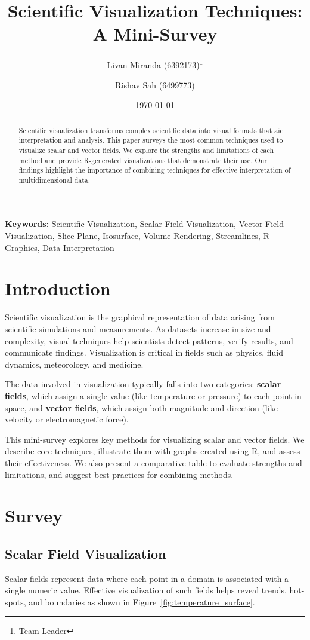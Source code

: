 \documentclass[11pt]{article}
\title{Scientific Visualization Techniques: A Mini-Survey}
\author{
	Livan Miranda (6392173)\thanks{Team Leader} \and
	Rishav Sah (6499773)
}
\date{\today}
\begin{document}
	
\maketitle
	
\begin{abstract}
	Scientific visualization transforms complex scientific data into visual formats that aid interpretation and analysis. This paper surveys the most common techniques used to visualize scalar and vector fields. We explore the strengths and limitations of each method and provide R-generated visualizations that demonstrate their use. Our findings highlight the importance of combining techniques for effective interpretation of multidimensional data.
\end{abstract}
	
\textbf{Keywords:} Scientific Visualization, Scalar Field Visualization, Vector Field Visualization, Slice Plane, Isosurface, Volume Rendering, Streamlines, R Graphics, Data Interpretation

	
\section{Introduction}
Scientific visualization is the graphical representation of data arising from scientific simulations and measurements. As datasets increase in size and complexity, visual techniques help scientists detect patterns, verify results, and communicate findings. Visualization is critical in fields such as physics, fluid dynamics, meteorology, and medicine.
	
The data involved in visualization typically falls into two categories: \textbf{scalar fields}, which assign a single value (like temperature or pressure) to each point in space, and \textbf{vector fields}, which assign both magnitude and direction (like velocity or electromagnetic force).
	
This mini-survey explores key methods for visualizing scalar and vector fields. We describe core techniques, illustrate them with graphs created using R, and assess their effectiveness. We also present a comparative table to evaluate strengths and limitations, and suggest best practices for combining methods.
	
\section{Survey}
	
\subsection{Scalar Field Visualization}
Scalar fields represent data where each point in a domain is associated with a single numeric value. Effective visualization of such fields helps reveal trends, hot-spots, and boundaries as shown in Figure~\ref{fig:temperature_surface}.
	
\end{document}
